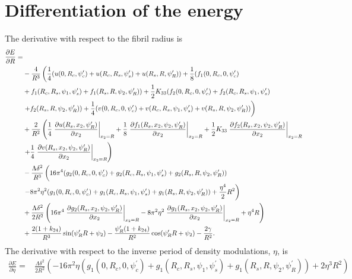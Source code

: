 \documentclass[12pt]{article}
\begin{document}
\section{Differentiation of the energy}
The derivative with respect to the fibril radius is
\begin{align}
\frac{\partial E}{\partial R}=&\nonumber\\
&-\frac{4}{R^3}\left(\frac{1}{4}(u(0,R_c,\psi_c^{\prime})+u(R_c,R_s,\psi_s^{\prime})+u(R_s,R,\psi_R^{\prime}))+\frac{1}{8}(f_1(0,R_c,0,\psi_c^{\prime})\right.\nonumber\\
&+f_1(R_c,R_s,\psi_1,\psi_s^{\prime})+f_1(R_s,R,\psi_2,\psi_R^{\prime}))+\frac{1}{2}K_{33}(f_2(0,R_c,0,\psi_c^{\prime})+f_2(R_c,R_s,\psi_1,\psi_s^{\prime})\nonumber\\
&\left.+f_2(R_s,R,\psi_2,\psi_R^{\prime}))+\frac{1}{4}(v(0,R_c,0,\psi_c^{\prime})+v(R_c,R_s,\psi_1,\psi_s^{\prime})+v(R_s,R,\psi_2,\psi_R^{\prime}))\right)\nonumber\\
&+\frac{2}{R^2}\left(\frac{1}{4}\left.\frac{\partial u(R_s,x_2,\psi_R^{\prime})}{\partial x_2}\right|_{x_2=R}+\frac{1}{8}\left.\frac{\partial f_1(R_s,x_2,\psi_2,\psi_R^{\prime})}{\partial x_2}\right|_{x_2=R}+\frac{1}{2}K_{33}\left.\frac{\partial f_2(R_s,x_2,\psi_2,\psi_R^{\prime})}{\partial x_2}\right|_{x_2=R}\right.\nonumber\\
&\left.+\frac{1}{4}\left.\frac{\partial v(R_s,x_2,\psi_2,\psi_R^{\prime})}{\partial x_2}\right|_{x_2=R}\right)\nonumber\\
&-\frac{\Lambda\delta^2}{R^3}\left(\vphantom{\frac{1}{2}}16\pi^4(g_2(0,R_c,0,\psi_c^{\prime})+g_2(R_c,R_s,\psi_1,\psi_s^{\prime})+g_2(R_s,R,\psi_2,\psi_R^{\prime}))\right.\nonumber\\
&\left.-8\pi^2\eta^2(g_1(0,R_c,0,\psi_c^{\prime})+g_1(R_c,R_s,\psi_1,\psi_s^{\prime})+g_1(R_s,R,\psi_2,\psi_R^{\prime}))+\frac{\eta^4}{2}R^2\right)\nonumber\\
&+\frac{\Lambda\delta^2}{2R^2}\left(16\pi^4\left.\frac{\partial g_2(R_s,x_2,\psi_2,\psi_R^{\prime})}{\partial x_2}\right|_{x_2=R}-8\pi^2\eta^2\left.\frac{\partial g_1(R_s,x_2,\psi_2,\psi_R^{\prime})}{\partial x_2}\right|_{x_2=R}+\eta^4R\right)\nonumber\\
&+\frac{2(1+k_{24})}{R^3}\sin(\psi_R^{\prime}R+\psi_2)-\frac{\psi_R^{\prime}(1+k_{24})}{R^2}\cos(\psi_R^{\prime}R+\psi_2)-\frac{2\gamma}{R^2}.\label{eq:dEdR}
\end{align}
The derivative with respect to the inverse period of density modulations, $\eta$, is
\begin{align}
\frac{\partial E}{\partial \eta}=&
\frac{\Lambda\delta^2}{2R^2}\left(-16\pi^2\eta(g_1(0,R_c,0,\psi_c^{\prime})+g_1(R_c,R_s,\psi_1,\psi_s^{\prime})+g_1(R_s,R,\psi_2,\psi_R^{\prime}))+2\eta^3R^2\right)\label{eq:dEdeta}
\end{align}
\end{document}
